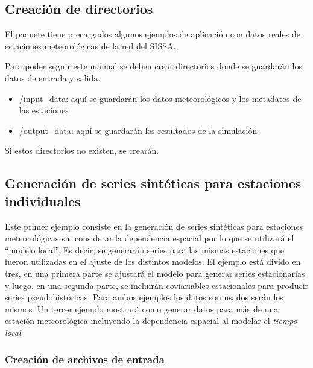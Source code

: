 \documentclass[
  12pt]{article}
\providecommand{\tightlist}{%
  \setlength{\itemsep}{0pt}\setlength{\parskip}{0pt}}
\begin{document}
\hypertarget{creaciuxf3n-de-directorios}{%
\subsection{Creación de directorios}\label{creaciuxf3n-de-directorios}}

El paquete tiene precargados algunos ejemplos de aplicación con datos reales de estaciones meteorológicas de la red del SISSA.

Para poder seguir este manual se deben crear directorios donde se guardarán los datos de entrada y salida.

\begin{itemize}
\tightlist
\item
  /input\_data: aquí se guardarán los datos meteorológicos y los metadatos de las estaciones
\item
  /output\_data: aquí se guardarán los resultados de la simulación
\end{itemize}

Si estos directorios no existen, se crearán.

\hypertarget{generaciuxf3n-de-series-sintuxe9ticas-para-estaciones-individuales}{%
\subsection{Generación de series sintéticas para estaciones individuales}\label{generaciuxf3n-de-series-sintuxe9ticas-para-estaciones-individuales}}

Este primer ejemplo consiste en la generación de series sintéticas para estaciones meteorológicas sin considerar la dependencia espacial por lo que se utilizará el ``modelo local''. Es decir, se generarán series para las mismas estaciones que fueron utilizadas en el ajuste de los distintos modelos. El ejemplo está divido en tres, en una primera parte se ajustará el modelo para generar series estacionarias y luego, en una segunda parte, se incluirán coviariables estacionales para producir series pseudohistóricas. Para ambos ejemplos los datos son usados serán los mismos. Un tercer ejemplo mostrará como generar datos para más de una estación meteorológica incluyendo la dependencia espacial al modelar el \emph{tiempo local}.

\hypertarget{creaciuxf3n-de-archivos-de-entrada}{%
\subsubsection{Creación de archivos de entrada}\label{creaciuxf3n-de-archivos-de-entrada}}
\end{document}
